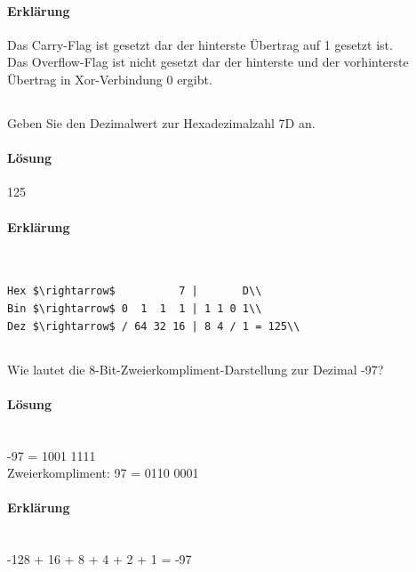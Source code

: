 \documentclass[12pt,twoside,a4paper]{article}
\begin{document}
\paragraph{Erklärung}
Das Carry-Flag ist gesetzt dar der hinterste Übertrag auf 1 gesetzt ist.\\
Das Overflow-Flag ist nicht gesetzt dar der hinterste und der vorhinterste Übertrag in Xor-Verbindung 0 ergibt.\\

\subsection{}

Geben Sie den Dezimalwert zur Hexadezimalzahl 7D an.

\paragraph{Lösung}
125

\paragraph{Erklärung}\\

\begin{lstlisting}
Hex $\rightarrow$          7 |       D\\
Bin $\rightarrow$ 0  1  1  1 | 1 1 0 1\\
Dez $\rightarrow$ / 64 32 16 | 8 4 / 1 = 125\\
\end{lstlisting}

\subsection{}

Wie lautet die 8-Bit-Zweierkompliment-Darstellung zur Dezimal -97?

\paragraph{Lösung}\\
                 -97 = 1001 1111\\
Zweierkompliment: 97 = 0110 0001

\paragraph{Erklärung}\\
-128 + 16 + 8 + 4 + 2 + 1 = -97
\end{document}
